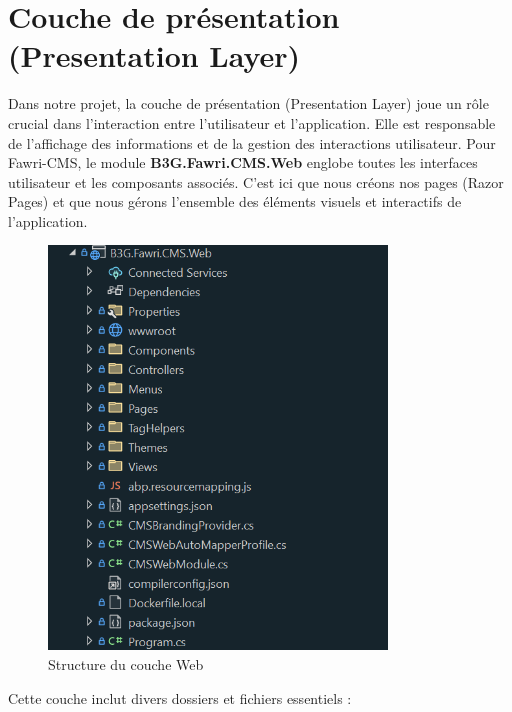 \section{Couche de présentation (Presentation Layer)}

\hspace{\parindent}Dans notre projet, la couche de présentation (Presentation Layer) joue un rôle crucial dans l'interaction entre l'utilisateur et l'application. Elle est responsable de l'affichage des informations et de la gestion des interactions utilisateur. Pour Fawri-CMS, le module \textbf{B3G.Fawri.CMS.Web} englobe toutes les interfaces utilisateur et les composants associés. C'est ici que nous créons nos pages (Razor Pages) et que nous gérons l'ensemble des éléments visuels et interactifs de l'application.



\begin{figure}[H] 
    \centering
    \includegraphics[width=9cm]{Figures/web folder.PNG}
    \caption{Structure du couche Web}
\end{figure}


Cette couche inclut divers dossiers et fichiers essentiels :

